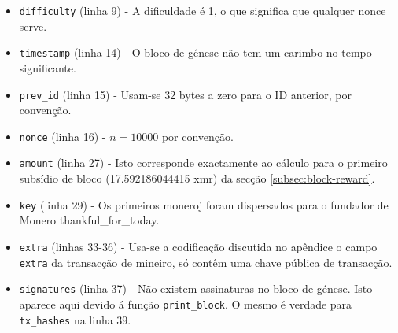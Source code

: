 \begin{appendices}
\begin{itemize}
	\item {\tt difficulty} (linha 9) - A dificuldade é 1, o que significa que qualquer nonce serve.
	\item {\tt timestamp} (linha 14) - O bloco de génese não tem um carimbo no tempo significante.
	\item {\tt prev\_id} (linha 15) - Usam-se 32 bytes a zero para o ID anterior, por convenção.
	\item {\tt nonce} (linha 16) - $n = 10000$ por convenção.
	\item {\tt amount} (linha 27) - Isto corresponde exactamente ao cálculo para o primeiro subsídio de bloco (17.592186044415 xmr) da secção \ref{subsec:block-reward}.
	\item {\tt key} (linha 29) - Os primeiros moneroj foram dispersados para o fundador de Monero thankful\_for\_today.
	\item {\tt extra} (linhas 33-36) - 
Usa-se a codificação discutida no apêndice %
o campo {\tt extra} da transacção de mineiro, só contêm uma chave pública de transacção.   
	\item {\tt signatures} (linha 37) - Não existem assinaturas no bloco de génese. Isto aparece aqui devido á função {\tt print\_block}. O mesmo é verdade para {\tt tx\_hashes} na linha 39.
\end{itemize}

\end{appendices}
